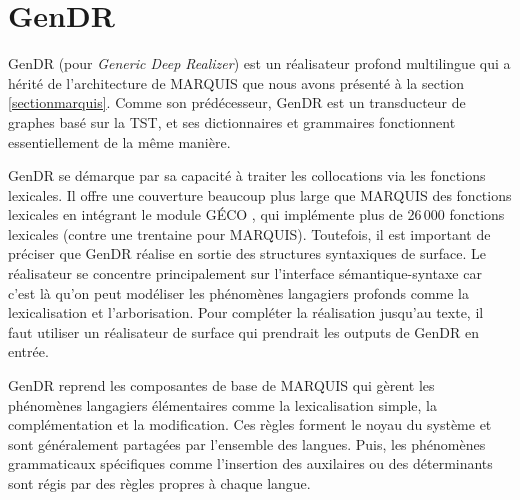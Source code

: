 
\chapter{GenDR}\label{chapgendr}

GenDR (pour \emph{Generic Deep Realizer}) est un réalisateur profond multilingue \citep{lareau18} qui a hérité de l'architecture de MARQUIS \cite{WannerMARQUISGENERATIONUSERTAILORED2010} que nous avons présenté à la section \ref{sectionmarquis}. Comme son prédécesseur, GenDR est un transducteur de graphes basé sur la \ac{TST}, et ses dictionnaires et grammaires fonctionnent essentiellement de la même manière.


GenDR se démarque par sa capacité à traiter les collocations via les fonctions lexicales. Il offre une couverture beaucoup plus large que MARQUIS des fonctions lexicales en intégrant le module GÉCO \citep{lambrey15,LambreyImplementationcollocationspour2017}, qui implémente plus de 26\,000 fonctions lexicales (contre une trentaine pour MARQUIS). Toutefois, il est important de préciser que GenDR réalise en sortie des structures syntaxiques de surface. Le réalisateur se concentre principalement sur l'interface sémantique-syntaxe car c'est là qu'on peut modéliser les phénomènes langagiers profonds comme la lexicalisation et l'arborisation. Pour compléter la réalisation jusqu'au texte, il faut utiliser un réalisateur de surface qui prendrait les outputs de GenDR en entrée.


GenDR reprend les composantes de base de MARQUIS qui gèrent les phénomènes langagiers élémentaires comme la  lexicalisation simple, la complémentation et la modification. Ces règles forment le noyau du système et sont généralement partagées par l'ensemble des langues. Puis, les phénomènes grammaticaux spécifiques comme l'insertion des auxilaires ou des déterminants sont régis par des règles propres à chaque langue.


